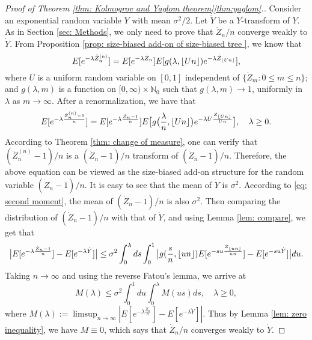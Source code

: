 \documentclass[12pt,a4paper]{amsart}
\DeclarePairedDelimiter\floor{\lfloor}{\rfloor}
\numberwithin{equation}{section}
\begin{document}
\begin{proof}[Proof of Theorem \ref{thm: Kolmogrov and Yaglom theorem}\eqref{thm:yaglom}.]
	Consider an exponential random variable $Y$ with mean $\sigma^2/2$.
	Let $\dot Y$ be a $Y$-transform of $Y$.
	As in Section \ref{sec: Methods}, 
    we only need to prove that
    $\dot Z_n/n$ converge weakly to $\dot Y$.
	From Proposition \ref{prop: size-biased add-on of size-biased tree }, we know that
	\[
	E [ e^{- \lambda \ddot Z_n^{(n)}} ]
		= E [e^{-\lambda \dot Z_n}] E[g(\lambda, \floor{Un})e^{-\lambda \dot Z_{\floor{Un}}}],
	\]
	where $U$ is a uniform  random variable on $[0,1]$ independent of $\{\dot Z_m: 0\le m\le n\}$;
	and $g(\lambda, m)$ is a function on $[0,\infty) \times \mathbb N_0$ such that
	$g(\lambda, m) \to 1$, uniformly in $\lambda$ as $m\to \infty$.
	After a renormalization, we have that
\begin{equation}\label{eq: renormalized size-biased add-on equation}
	E [ e^{- \lambda \frac{\ddot Z_n^{(n)}-1}{n}} ]
	= E [e^{-\lambda \frac{\dot Z_n - 1}{n}}] E\big[g\big(\frac{\lambda}{n}, \floor{Un} \big)e^{-\lambda U \frac{\dot Z_{\floor{Un}}}{Un} }\big],
	\quad \lambda \geq 0.
\end{equation}
	According to Theorem \ref{thm: change of measure}, one can verify that
	$(\ddot Z_n^{(n)} - 1)/n$ is a $(\dot Z_n - 1)/n$ transform of $(\dot Z_n - 1)/n$.
	Therefore, the above equation can be viewed as the size-biased add-on structure for the random variable $(\dot Z_n - 1)/n$.
	It is easy to see that the mean of $\dot Y$ is $\sigma^2$.
	According to \eqref{eq: second moment}, the mean of $(\dot Z_n - 1)/n$ is also $\sigma^2$.
Then comparing the distribution of $(\dot Z_n - 1)/n$ with that of $\dot Y$, and  using Lemma \ref{lem: compare}, we get that
\[
	\big| E[e^{-\lambda \frac{\dot Z_n - 1}{n}}] - E[e^{-\lambda \dot Y}]\big|
	 \leq \sigma^2 \int_0^\lambda ds \int_0^1 \big| g(\frac{s}{n}, \floor{un}) E[e^{-su \frac { \dot Z_{\floor{un}} } {un} }] - E[e^{- su \dot Y}]\big| du.
\]
Taking $n\to \infty$ and using the reverse Fatou's lemma, we arrive at
\[
	M(\lambda)
	\leq \sigma^2 \int_0^1du \int_0^\lambda M(us)ds,
	\quad \lambda\geq 0,
\]
	where
$M(\lambda) := \limsup_{n\to \infty} | E[ e^{- \lambda \frac{\dot Z_n }{n}}] - E[e^{-\lambda \dot Y}]|$.
	Thus by Lemma \ref{lem: zero inequality}, we have $M \equiv 0$, which says that $\dot Z_n/n$ converges weakly to $\dot Y$.
\end{proof}
\end{document}
